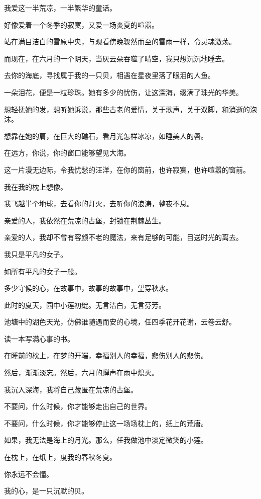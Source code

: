 \documentclass[12pt,a4paper]{article}
\begin{document}
		我爱这一半荒凉，一半繁华的童话。\par
		好像爱着一个冬季的寂寞，又爱一场炎夏的喧嚣。\par
		站在满目洁白的雪原中央，与观看傍晚骤然而至的雷雨一样，令灵魂激荡。\par
		而现在，在六月的一个阴天，当灰云朵吞噬了晴空，我只想沉沉地睡去。\par
		去你的海底，寻找属于我的一只贝，相遇在星夜里落了眼泪的人鱼。\par
		一朵泪花，便是一粒珍珠。她有多少的忧伤，让这深海，缀满了珠光的华美。\par
		想轻抚她的发，想听她诉说，那些古老的爱情，关于歌声，关于双脚，和消逝的泡沫。\par
		想靠在她的肩，在巨大的礁石，看月光怎样冰凉，如睡美人的唇。\par
		在远方，你说，你的窗口能够望见大海。\par
		这一片漫无边际，令我忧愁的汪洋，在你的窗前，也许寂寞，也许喧嚣的窗前。\par
		我在我的枕上想像。\par
		我飞越半个地球，去看你的灯火，去听你的浪涛，整夜不息。\par
		亲爱的人，我依然在荒凉的古堡，封锁在荆棘丛生。\par
		亲爱的人，我却不曾有容颜不老的魔法，来有足够的可能，目送时光的离去。\par
		我只是平凡的女子。\par
		如所有平凡的女子一般。

		多少守候的心，在故事中，故事的故事中，望穿秋水。\par
		此时的夏天，园中小莲初绽。无言洁白，无言芬芳。\par
		池塘中的湖色天光，仿佛谁随遇而安的心境，任四季花开花谢，云卷云舒。\par
		读一本写满心事的书。\par
		在睡前的枕上，在梦的开端，幸福别人的幸福，悲伤别人的悲伤。\par
		然后，渐渐淡忘。然后，六月的蝉声在雨中熄灭。\par
		我沉入深海，我将自己藏匿在荒凉的古堡。\par
		不要问，什么时候，你才能够走出自己的世界。\par
		不要问，什么时候，你才能够停止这一场场枕上的，纸上的荒唐。\par
		如果，我无法是海上的月光。那么，任我做池中淡定微笑的小莲。\par
		在枕上，在纸上，度我的春秋冬夏。

		你永远不会懂。\par
		我的心，是一只沉默的贝。
\end{document}

